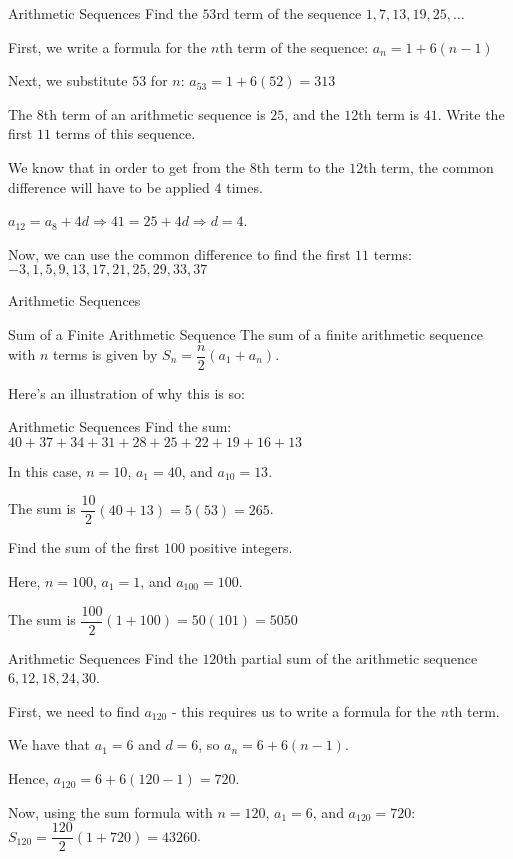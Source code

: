 \documentclass[t]{beamer}
\newcommand{\fp}[1]{\left({#1}\right)} %
\def\then{\Rightarrow}
\begin{document}
	\begin{frame}{Arithmetic Sequences}
		Find the $53$rd term of the sequence $1, 7, 13, 19, 25, \dots$ \pause
		
		First, we write a formula for the $n$th term of the sequence: $a_n = 1 + 6(n - 1)$ \pause
		
		Next, we substitute $53$ for $n$: $a_{53} = 1 + 6(52) = 313$ \pause \vspace{8pt}
		
		The $8$th term of an arithmetic sequence is $25$, and the $12$th term is $41$. Write the first $11$ terms of this sequence. \pause
		
		We know that in order to get from the $8$th term to the $12$th term, the common difference will have to be applied $4$ times. \pause
		
		$a_{12} = a_8 + 4d \then 41 = 25 + 4d \then d = 4$. \pause
		
		Now, we can use the common difference to find the first $11$ terms: $-3, 1, 5, 9, 13, 17, 21, 25, 29, 33, 37$ 
	\end{frame}

	\begin{frame}{Arithmetic Sequences}
		\begin{block}{Sum of a Finite Arithmetic Sequence}
			The sum of a finite arithmetic sequence with $n$ terms is given by $S_n = \dfrac{n}{2}\fp{a_1 + a_n}$.
		\end{block} \pause
	
		Here's an illustration of why this is so:
	\end{frame}

	\begin{frame}{Arithmetic Sequences}
		Find the sum: $40 + 37 + 34 + 31 + 28 + 25 + 22 + 19 + 16 + 13$ \pause
		
		In this case, $n = 10$, $a_1 = 40$, and $a_{10} = 13$. \pause
		
		The sum is $\dfrac{10}{2}\fp{40 + 13} = 5(53) = 265$. \vspace{12pt} \pause
		
		Find the sum of the first $100$ positive integers. \pause
		
		Here, $n = 100$, $a_1 = 1$, and $a_{100} = 100$. \pause
		
		The sum is $\dfrac{100}{2}\fp{1 + 100} = 50(101) = 5050$
	\end{frame}

	\begin{frame}{Arithmetic Sequences}
		Find the $120$th partial sum of the arithmetic sequence \\ $6, 12, 18, 24, 30$. \pause
		
		First, we need to find $a_{120}$ - this requires us to write a formula for the $n$th term. \pause
		
		We have that $a_1 = 6$ and $d = 6$, so $a_n = 6 + 6(n - 1)$. \pause
		
		Hence, $a_{120} = 6 + 6(120 - 1) = 720$. \pause
		
		Now, using the sum formula with $n = 120$, $a_1 = 6$, and $a_{120} = 720$: $S_{120} = \dfrac{120}{2}\fp{1 + 720} = 43260$.
	\end{frame}
\end{document}
